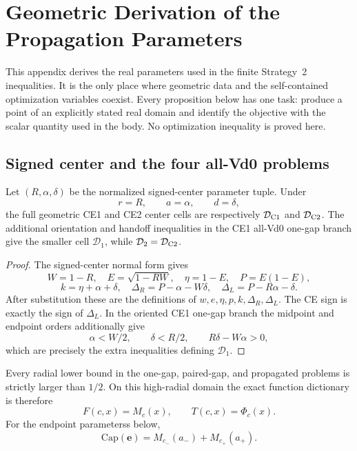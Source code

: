 \section{Geometric Derivation of the Propagation Parameters}
\label{sec:strategy2-parameter-bridges}

This appendix derives the real parameters used in the finite Strategy~2 inequalities.  It is the only place where geometric data and the
self-contained optimization variables coexist.  Every proposition below has
one task: produce a point of an explicitly stated real domain and identify
the objective with the scalar quantity used in the body.  No optimization
inequality is proved here.

\subsection{Signed center and the four all-Vd0 problems}

\begin{proposition}
\label{prop:s2-domain-bridge}
Let \((R,\alpha,\delta)\) be the normalized signed-center parameter tuple.  Under
\[
 r=R,\qquad a=\alpha,\qquad d=\delta,
\]
the full geometric CE1 and CE2 center cells are respectively
\(\mathcal D_{\rm C1}\) and \(\mathcal D_{\rm C2}\).  The additional
orientation and handoff inequalities in the CE1 all-Vd0 one-gap branch give
the smaller cell \(\mathcal D_1\), while
\(\mathcal D_2=\mathcal D_{\rm C2}\).
\end{proposition}

\begin{proof}
The signed-center normal form gives
\[
 W=1-R,\quad E=\sqrt{1-RW},\quad
 \eta=1-E,\quad P=E(1-E),
\]
\[
 k=\eta+\alpha+\delta,\quad
 \Delta_R=P-\alpha-W\delta,\quad
 \Delta_L=P-R\alpha-\delta.
\]
After substitution these are the definitions of
\(w,e,\eta,p,k,\Delta_R,\Delta_L\).  The CE sign is exactly the sign of
\(\Delta_L\).  In the oriented CE1 one-gap branch the midpoint and endpoint
orders additionally give
\[
 \alpha<W/2,\qquad \delta<R/2,\qquad
 R\delta-W\alpha>0,
\]
which are precisely the extra inequalities defining \(\mathcal D_1\).
\end{proof}

Every radial lower bound in the one-gap, paired-gap, and propagated
problems is strictly larger than $1/2$.  On this high-radial domain the exact
function dictionary is therefore
\[
 F(c,x)=M_c(x),
 \qquad
 T(c,x)=\Phi_c(x).
\]
For the endpoint parameterss below,
\[
 \mathrm{Cap}(\mathbf e)
 =M_{c_-}(a_-)+M_{c_+}(a_+).
\]

